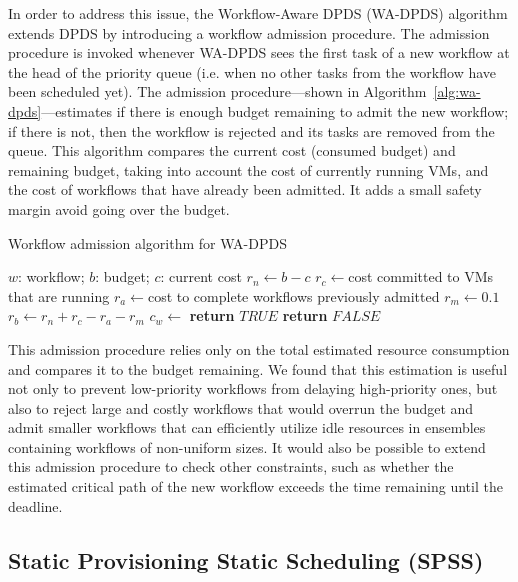 \documentclass{sig-alternate}
\begin{document}
In order to address this issue, the Workflow-Aware DPDS (WA-DPDS) algorithm extends 
DPDS by introducing a workflow admission procedure. The admission procedure is
invoked whenever WA-DPDS sees the first task of a new workflow at the head of the 
priority queue (i.e. when no other tasks from the workflow have been scheduled yet). 
The admission procedure---shown in Algorithm~\ref{alg:wa-dpds}---estimates if there is 
enough budget remaining to admit the new workflow; if there is not, then the 
workflow is rejected and its tasks are removed from the queue. This algorithm 
compares the current cost (consumed budget) and remaining budget, taking
into account the cost of currently running VMs, and the cost of workflows 
that have already been admitted. It adds a small safety margin avoid going over
the budget.

\begin{algorithm}
\caption{Workflow admission algorithm for WA-DPDS}
\label{alg:wa-dpds}
\begin{algorithmic}[1]
\Require $w$: workflow; $b$: budget; $c$: current cost
    \State $r_n\gets b-c$ 
    \State $r_c\gets $cost committed to VMs that are running
    \State $r_a\gets $cost to complete workflows previously admitted
	\State $r_m\gets 0.1$ 
	\State $r_b\gets r_n+r_c-r_a-r_m$ 
	\State $c_w\gets$ 
    	\State \textbf{return} $TRUE$
    \Else
    	\State \textbf{return} $FALSE$
	\EndIf    	 
\EndProcedure
\end{algorithmic} 
\end{algorithm}


This admission procedure relies only on the total estimated resource consumption and
compares it to the budget remaining. We found that this estimation is useful not
only to prevent low-priority workflows from delaying high-priority ones, but
also to reject large and costly workflows that would overrun the budget and
admit smaller workflows that can efficiently utilize idle resources in ensembles 
containing workflows of non-uniform sizes. It would also be possible to extend this 
admission procedure to check other constraints, such as whether the estimated 
critical path of the new workflow exceeds the time remaining until the deadline.



\subsection{Static Provisioning Static Scheduling (SPSS)}
\end{document}
